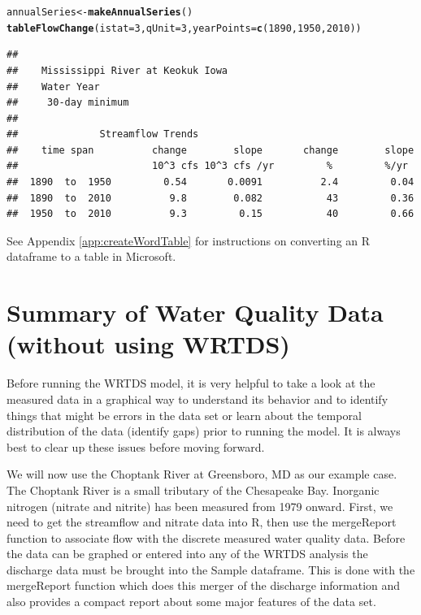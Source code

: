 \documentclass[a4paper,11pt]{article}\usepackage{graphicx, color}
\makeatletter
\newcommand{\hlfunctioncall}[1]{\textcolor[rgb]{0.501960784313725,0,0.329411764705882}{\textbf{#1}}}%
\newenvironment{kframe}{%
 \def\at@end@of@kframe{}%
 \ifinner\ifhmode%
  \def\at@end@of@kframe{\end{minipage}}%
  \begin{minipage}{\columnwidth}%
 \fi\fi%
 \def\FrameCommand##1{\hskip\@totalleftmargin \hskip-\fboxsep
 \colorbox{shadecolor}{##1}\hskip-\fboxsep
     \hskip-\linewidth \hskip-\@totalleftmargin \hskip\columnwidth}%
 \MakeFramed {\advance\hsize-\width
   \@totalleftmargin\z@ \linewidth\hsize
   \@setminipage}}%
 {\par\unskip\endMakeFramed%
 \at@end@of@kframe}
\newenvironment{knitrout}{}{} %
\makeatother
\begin{document}
\begin{knitrout}
\color{fgcolor}\begin{kframe}
\begin{alltt}
annualSeries <- \hlfunctioncall{makeAnnualSeries}()
\hlfunctioncall{tableFlowChange}(istat=3, qUnit=3,yearPoints=\hlfunctioncall{c}(1890,1950,2010))
\end{alltt}
\begin{verbatim}
## 
##    Mississippi River at Keokuk Iowa
##    Water Year
##     30-day minimum 
## 
##              Streamflow Trends
##    time span          change        slope       change        slope
##                       10^3 cfs 10^3 cfs /yr         %         %/yr
##  1890  to  1950         0.54       0.0091          2.4         0.04
##  1890  to  2010          9.8        0.082           43         0.36
##  1950  to  2010          9.3         0.15           40         0.66
\end{verbatim}
\end{kframe}
\end{knitrout}


See Appendix \ref{app:createWordTable} for instructions on converting an R dataframe to a table in Microsoft. 

\FloatBarrier


\section{Summary of Water Quality Data (without using WRTDS)}
\label{sec:wqa}
Before running the WRTDS model, it is very helpful to take a look at the measured data in a graphical way to understand its behavior and to identify things that might be errors in the data set or learn about the temporal distribution of the data (identify gaps) prior to running the model.  It is always best to clear up these issues before moving forward.

We will now use the Choptank River at Greensboro, MD as our example case. The Choptank River is a small tributary of the Chesapeake Bay. Inorganic nitrogen (nitrate and nitrite) has been measured from 1979 onward. First, we need to get the streamflow and nitrate data into R, then use the mergeReport function to associate flow with the discrete measured water quality data. Before the data can be graphed or entered into any of the WRTDS analysis the discharge data must be brought into the Sample dataframe.  This is done with the mergeReport function which does this merger of the discharge information and also provides a compact report about some major features of the data set.
\end{document}

